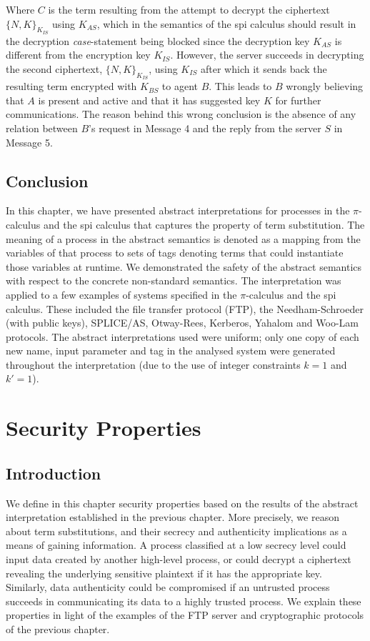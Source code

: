 \documentclass[10pt,a4paper,final,oneside,fleqn]{book}
\begin{document}
\noindent
Where $C$ is the term resulting from the attempt to decrypt the ciphertext $\{N,K\}_{K_{IS}}$ using $K_{AS}$, which in the semantics of the spi calculus should result in the decryption {\itshape case\/}-statement being blocked since the decryption key $K_{AS}$ is different from the encryption key $K_{IS}$.  However, the server succeeds in decrypting the second ciphertext, $\{N,K\}_{K_{IS}}$, using $K_{IS}$ after which it sends back the resulting term encrypted with $K_{BS}$ to agent $B$.  This leads to $B$ wrongly believing that $A$ is present and active and that it has suggested key $K$ for further communications.  The reason behind this wrong conclusion is the absence of any relation between $B$'s request in Message 4 and the reply from the server $S$ in Message 5. 
\section{Conclusion}
In this chapter, we have presented abstract interpretations for processes in the $\pi$-calculus and the spi calculus that captures the property of term substitution.  The meaning of a process in the abstract semantics is denoted as a mapping from the variables of that process to sets of tags denoting terms that could instantiate those variables at runtime.  We demonstrated the safety of the abstract semantics with respect to the concrete non-standard semantics.  The interpretation was applied to a few examples of systems specified in the $\pi$-calculus and the spi calculus. These included the file transfer protocol (FTP), the Needham-Schroeder (with public keys), SPLICE/AS, Otway-Rees, Kerberos, Yahalom and Woo-Lam protocols.  The abstract interpretations used were uniform; only one copy of each new name, input parameter and tag in the analysed system were generated throughout the interpretation (due to the use of integer constraints $k=1$ and $k'=1$).
\chapter{Security Properties}
\section{Introduction}
We define in this chapter security properties based on the results of the abstract interpretation established in the previous chapter.  More precisely, we reason about term substitutions, and their secrecy and authenticity implications as a means of gaining information.  A process classified at a low secrecy level could input data created by another high-level process, or could decrypt a ciphertext revealing the underlying sensitive plaintext if it has the appropriate key.  Similarly, data authenticity could be compromised if an untrusted process succeeds in communicating its data to a highly trusted process.  We explain these properties in light of the examples of the FTP server and cryptographic protocols of the previous chapter.
\end{document}
